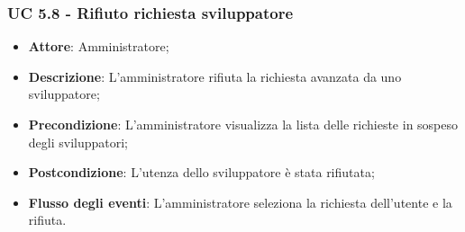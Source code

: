 \subsubsection{UC 5.8 - Rifiuto richiesta sviluppatore}
\begin{itemize}
\item \textbf{Attore}: Amministratore;
\item \textbf{Descrizione}: L'amministratore rifiuta la richiesta avanzata da uno sviluppatore;
\item \textbf{Precondizione}: L'amministratore visualizza la lista delle richieste in sospeso degli sviluppatori;
\item \textbf{Postcondizione}: L'utenza dello sviluppatore è stata rifiutata;
\item \textbf{Flusso degli eventi}: L'amministratore seleziona la richiesta dell'utente e la rifiuta.
\end{itemize}


